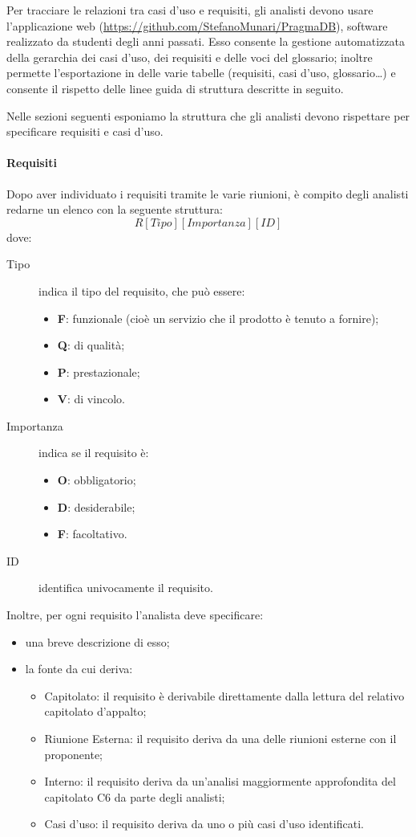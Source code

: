 Per tracciare le relazioni tra casi d'uso e requisiti, gli analisti devono usare l'applicazione web  (\url{https://github.com/StefanoMunari/PragmaDB}), software realizzato da studenti degli anni passati. Esso consente la gestione automatizzata della gerarchia dei casi d'uso, dei requisiti e delle voci del glossario; inoltre permette l'esportazione in  delle varie tabelle (requisiti, casi d'uso, glossario\dots) e consente il rispetto delle linee guida di struttura descritte in seguito.

Nelle sezioni seguenti esponiamo la struttura che gli analisti devono rispettare per specificare requisiti e casi d'uso.

\paragraph{Requisiti} 
Dopo aver individuato i requisiti tramite le varie riunioni, è compito degli analisti redarne un elenco con la seguente struttura:
	\[R[Tipo][Importanza][ID]\]
dove:
\begin{description}
	\item[Tipo] indica il tipo del requisito, che può essere:
	\begin{itemize}
		\item \textbf{F}: funzionale (cioè un servizio che il prodotto è tenuto a fornire);
		\item \textbf{Q}: di qualità;
		\item \textbf{P}: prestazionale;
		\item \textbf{V}: di vincolo.
	\end{itemize}
	\item[Importanza] indica se il requisito è:
	\begin{itemize}
		\item \textbf{O}: obbligatorio;
		\item \textbf{D}: desiderabile;
		\item \textbf{F}: facoltativo. 
	\end{itemize}
	\item[ID] identifica univocamente il requisito.
\end{description}
Inoltre, per ogni requisito l'analista deve specificare:
\begin{itemize}
	\item una breve descrizione di esso;
	\item la fonte da cui deriva:
	\begin{itemize}
		\item Capitolato: il requisito è derivabile direttamente dalla lettura del relativo capitolato d'appalto;
		\item Riunione Esterna: il requisito deriva da una delle riunioni esterne con il proponente;
		\item Interno: il requisito deriva da un'analisi maggiormente approfondita del capitolato C6 da parte degli analisti;
		\item Casi d'uso: il requisito deriva da uno o più casi d'uso identificati.
	\end{itemize}
\end{itemize}

